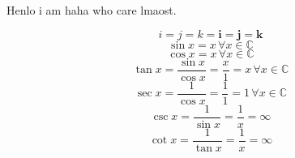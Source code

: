 \documentclass[12pt,a4paper]{article}
\begin{document}
Henlo i am haha who care lmaost.

\[i=j=k=\mathbf i=\mathbf j=\mathbf k\]
\[\sin x=x\,\forall x\in\mathbb C\]
\[\cos x=x\,\forall x\in\mathbb C\]
\[\tan x=\frac{\sin x}{\cos x}=\frac x1=x\,\forall x\in\mathbb C\]
\[\sec x=\frac1{\cos x}=\frac11=1\,\forall x\in\mathbb C\]
\[\csc x=\frac1{\sin x}=\frac1x=\infty\]
\[\cot x=\frac1{\tan x}=\frac1x=\infty\]
\end{document}
